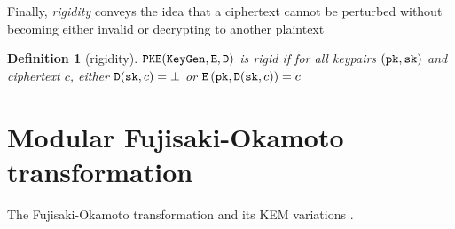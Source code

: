 \documentclass{article}
\newtheorem{definition}{Definition}[section]
\begin{document}
Finally, \emph{rigidity} conveys the idea that a ciphertext cannot be perturbed without becoming either invalid or decrypting to another plaintext

\begin{definition}[rigidity]\label{def:rigidity}
    $\texttt{PKE}(\texttt{KeyGen}, \texttt{E}, \texttt{D})$ is \emph{rigid} if for all keypairs $(\texttt{pk}, \texttt{sk})$ and ciphertext $c$, either $\texttt{D}(\texttt{sk}, c) = \bot$ or $\texttt{E}\left(\texttt{pk}, \texttt{D}(\texttt{sk}, c)\right) = c$
\end{definition}

\section{Modular Fujisaki-Okamoto transformation}
The Fujisaki-Okamoto transformation \cite{fujisaki1999secure} and its KEM variations \cite{hofheinz2017modular}.



\end{document}
